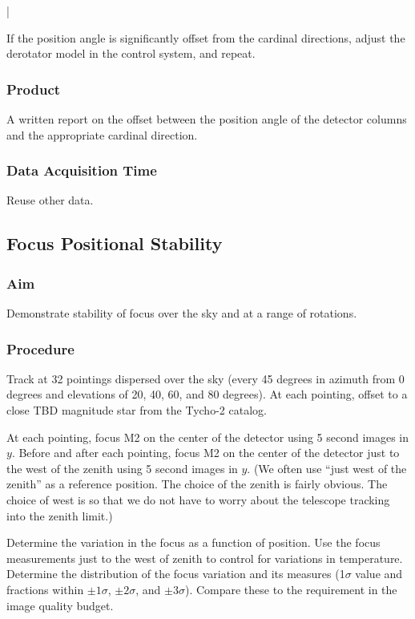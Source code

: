 |\documentclass{article}
\begin{document}
If the position angle is significantly offset from the cardinal directions, adjust the derotator model in the control system, and repeat.

\subsubsection{Product}

A written report on the offset between the position angle of the detector columns and the appropriate cardinal direction.

\subsubsection{Data Acquisition Time}

Reuse other data.


\subsection{Focus Positional Stability}

\subsubsection{Aim}

Demonstrate stability of focus over the sky and at a range of rotations.

\subsubsection{Procedure}

Track at 32 pointings dispersed over the sky (every 45 degrees in azimuth from 0 degrees and elevations of 20, 40, 60, and 80 degrees). At each pointing, offset to a close TBD magnitude star from the Tycho-2 catalog.

At each pointing, focus M2 on the center of the detector using 5 second images in $y$. Before and after each pointing, focus M2 on the center of the detector just to the west of the zenith using 5 second images in $y$. (We often use “just west of the zenith” as a reference position. The choice of the zenith is fairly obvious. The choice of west is so that we do not have to worry about the telescope tracking into the zenith limit.)

Determine the variation in the focus as a function of position. Use the focus measurements just to the west of zenith to control for variations in temperature. Determine the distribution of the focus variation and its measures (1$\sigma$ value and fractions within $\pm1\sigma$, $\pm2\sigma$, and $\pm3\sigma$). Compare these to the requirement in the image quality budget.
\end{document}
